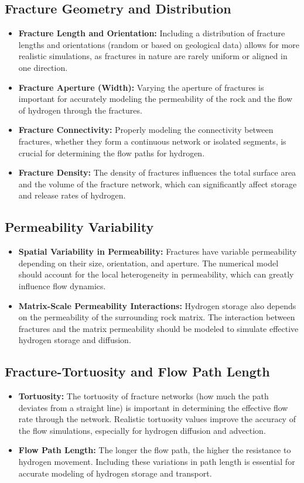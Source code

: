 \documentclass{article}
\begin{document}
\subsection{Fracture Geometry and Distribution}
\begin{itemize}
    \item \textbf{Fracture Length and Orientation:} Including a distribution of fracture lengths and orientations (random or based on geological data) allows for more realistic simulations, as fractures in nature are rarely uniform or aligned in one direction.
    \item \textbf{Fracture Aperture (Width):} Varying the aperture of fractures is important for accurately modeling the permeability of the rock and the flow of hydrogen through the fractures.
    \item \textbf{Fracture Connectivity:} Properly modeling the connectivity between fractures, whether they form a continuous network or isolated segments, is crucial for determining the flow paths for hydrogen.
    \item \textbf{Fracture Density:} The density of fractures influences the total surface area and the volume of the fracture network, which can significantly affect storage and release rates of hydrogen.
\end{itemize}

\subsection{Permeability Variability}
\begin{itemize}
    \item \textbf{Spatial Variability in Permeability:} Fractures have variable permeability depending on their size, orientation, and aperture. The numerical model should account for the local heterogeneity in permeability, which can greatly influence flow dynamics.
    \item \textbf{Matrix-Scale Permeability Interactions:} Hydrogen storage also depends on the permeability of the surrounding rock matrix. The interaction between fractures and the matrix permeability should be modeled to simulate effective hydrogen storage and diffusion.
\end{itemize}

\subsection{Fracture-Tortuosity and Flow Path Length}
\begin{itemize}
    \item \textbf{Tortuosity:} The tortuosity of fracture networks (how much the path deviates from a straight line) is important in determining the effective flow rate through the network. Realistic tortuosity values improve the accuracy of the flow simulations, especially for hydrogen diffusion and advection.
    \item \textbf{Flow Path Length:} The longer the flow path, the higher the resistance to hydrogen movement. Including these variations in path length is essential for accurate modeling of hydrogen storage and transport.
\end{itemize}
\end{document}
